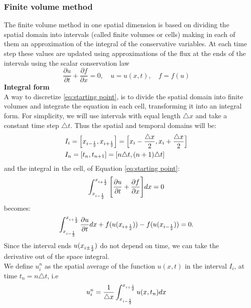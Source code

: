 \documentclass[12pt,a4paper]{article}
\numberwithin{equation}{section}
\begin{document}
\subsubsection{Finite volume method}
The finite volume method in one spatial dimension is based on dividing the
spatial domain into intervals (called finite volumes or cells) making in each
of them an approximation of the integral of the conservative variables. At
each time step these values are updated using approximations of the flux
at the ends of the intervals using the scalar conservation law 
\begin{equation} \label{eq:starting point}
\frac{\partial u}{\partial t} + \frac{\partial f}{\partial x} = 0, \quad u = u(x,t), \quad f = f(u)
\end{equation}
{\bf Integral form}\\
A way to discretize \ref{eq:starting point}, is to divide the spatial
domain into finite volumes and integrate the equation in each cell, transforming
it into an integral form. For simplicity, we will use intervals with equal length $\triangle x$ and take a constant time step $\triangle t$. Thus the
spatial and temporal domains will be:
\begin{align*}
& I_i =\Big[x_{i-{1\over 2}}, x_{i+{1\over 2}}\Big] = \Big[x_i- \frac{\triangle x}{2}, x_i+\frac{\triangle x}{2}\Big] \\
& I_n = [t_n, t_{n+1}] = [n\triangle t, (n+1)\triangle t]
\end{align*}
and the integral in the cell, of Equation \ref{eq:starting point}:
\begin{equation}
\int_{x_{i-{1\over 2}}}^{x_{i+{1\over 2}}} \Bigg[\frac{\partial u}{\partial t} + \frac{\partial f}{\partial x}\Bigg] dx = 0
\end{equation}
becomes:
\begin{equation}\label{integrata}
\int_{x_{i-{1\over 2}}}^{x_{i+{1\over 2}}} \frac{\partial u}{\partial t} dx  + f(u(x_{i+{1\over 2}}))-f(u(x_{i-{1\over 2}})) = 0.
\end{equation}
Since the interval ends $u(x_{i\pm{1\over 2}})$ do not depend on time, we can take the derivative out of the space integral.\\
We define $u_i^n$ as the spatial average of the function $u(x,t)$ in the interval $I_i$, at time $t_n = n\triangle t$, i.e
\begin{equation} \label{media}
u_i^n = \frac{1}{\triangle x} \int_{x_{i-{1\over 2}}}^{x_{i+{1\over 2}}} u(x, t_n)dx
\end{equation}
\end{document}
